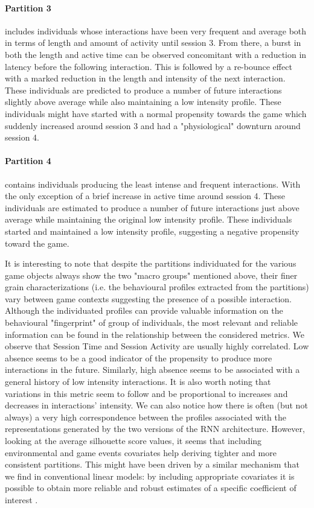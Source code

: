 \paragraph*{\textbf{Partition 3}} includes individuals whose interactions have been very frequent and average both in terms of length and amount of activity until session 3. From there, a burst in both the length and active time can be observed concomitant with a reduction in latency before the following interaction. This is followed by a re-bounce effect with a marked reduction in the length and intensity of the next interaction. These individuals are predicted to produce a number of future interactions slightly above average while also maintaining a low intensity profile. These individuals might have started with a normal propensity towards the game which suddenly increased around session 3 and had a "physiological" downturn around session 4. 

\paragraph*{\textbf{Partition 4}} contains individuals producing the least intense and frequent interactions. With the only exception of a brief increase in active time around session 4. These individuals are estimated to produce a number of future interactions just above average while maintaining the original low intensity profile. These individuals started and maintained a low intensity profile, suggesting a negative propensity toward the game. 

It is interesting to note that despite the partitions individuated for the various game objects always show the two "macro groups" mentioned above, their finer grain characterizations (i.e. the behavioural profiles extracted from the partitions) vary between game contexts suggesting the presence of a possible interaction. Although the individuated profiles can provide valuable information on the behavioural "fingerprint" of group of individuals, the most relevant and reliable information can be found in the relationship between the considered metrics. We observe that Session Time and Session Activity are usually highly correlated. Low absence seems to be a good indicator of the propensity to produce more interactions in the future. Similarly, high absence seems to be associated with a general history of low intensity interactions. It is also worth noting that variations in this metric seem to follow and be proportional to increases and decreases in interactions' intensity. We can also notice how there is often (but not always) a very high correspondence between the profiles associated with the representations generated by the two versions of the RNN architecture. However, looking at the average silhouette score values, it seems that including environmental and game events covariates help deriving tighter and more consistent partitions. This might have been driven by a similar mechanism that we find in conventional linear models: by including appropriate covariates it is possible to obtain more reliable and robust estimates of a specific coefficient of interest \cite{gelman2020regression}.

